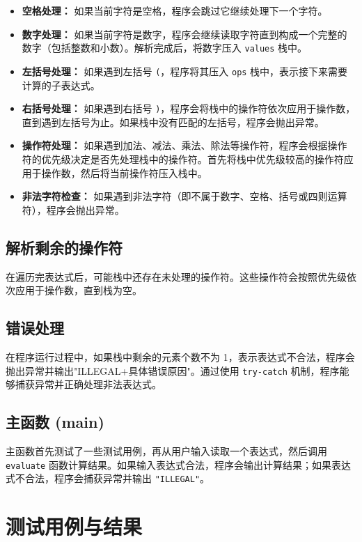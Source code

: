 \documentclass[UTF8]{ctexart}
\begin{document}
\begin{itemize}
    \item \textbf{空格处理：} 如果当前字符是空格，程序会跳过它继续处理下一个字符。
    \item \textbf{数字处理：} 如果当前字符是数字，程序会继续读取字符直到构成一个完整的数字（包括整数和小数）。解析完成后，将数字压入 \texttt{values} 栈中。
    \item \textbf{左括号处理：} 如果遇到左括号 \texttt{(}，程序将其压入 \texttt{ops} 栈中，表示接下来需要计算的子表达式。
    \item \textbf{右括号处理：} 如果遇到右括号 \texttt{)}，程序会将栈中的操作符依次应用于操作数，直到遇到左括号为止。如果栈中没有匹配的左括号，程序会抛出异常。
    \item \textbf{操作符处理：} 如果遇到加法、减法、乘法、除法等操作符，程序会根据操作符的优先级决定是否先处理栈中的操作符。首先将栈中优先级较高的操作符应用于操作数，然后将当前操作符压入栈中。
    \item \textbf{非法字符检查：} 如果遇到非法字符（即不属于数字、空格、括号或四则运算符），程序会抛出异常。
    
\end{itemize}

\subsection{解析剩余的操作符}

在遍历完表达式后，可能栈中还存在未处理的操作符。这些操作符会按照优先级依次应用于操作数，直到栈为空。

\subsection{错误处理}

在程序运行过程中，如果栈中剩余的元素个数不为 1，表示表达式不合法，程序会抛出异常并输出"ILLEGAL+具体错误原因"。通过使用 \texttt{try-catch} 机制，程序能够捕获异常并正确处理非法表达式。

\subsection{主函数 (main)}
主函数首先测试了一些测试用例，再从用户输入读取一个表达式，然后调用 \texttt{evaluate} 函数计算结果。如果输入表达式合法，程序会输出计算结果；如果表达式不合法，程序会捕获异常并输出 \texttt{"ILLEGAL"}。


\section{测试用例与结果}
\end{document}
